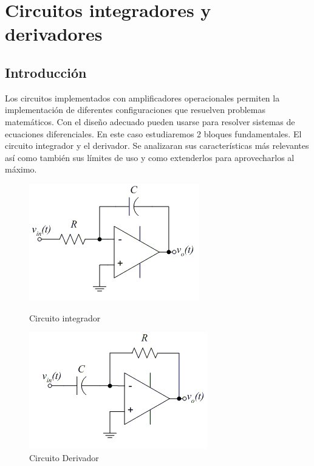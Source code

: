 \usepackage[spanish]{babel}
\usepackage[utf8]{inputenc}



\usepackage{float}
\usepackage{graphicx}

\usepackage[american voltage]{circuitikz}

\usepackage{amsmath}

\usepackage{xcolor}

\usepackage{caption}
\usepackage{subcaption}



\section{Circuitos integradores y derivadores}
\subsection{Introducción}
Los circuitos implementados con amplificadores operacionales permiten la implementación de diferentes configuraciones que resuelven problemas matemáticos. Con el diseño adecuado pueden usarse para resolver sistemas de ecuaciones diferenciales.
En este caso estudiaremos 2 bloques fundamentales. El circuito integrador y el derivador. Se analizaran sus características más relevantes así como también sus límites de uso y como extenderlos para aprovecharlos al máximo.

\begin{figure}[hbt!]
	\includegraphics[scale=1]{Ejercicio4/integrador.png}
	\caption{Circuito integrador} 
	
	\includegraphics{Ejercicio4/derivador}
	\caption{Circuito Derivador} 
	
\end{figure}

